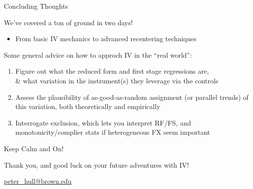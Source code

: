 \documentclass{beamer}
\begin{document}
\begin{frame}{Concluding Thoughts}

We've covered a ton of ground in two days! 
\begin{itemize}
\item From basic IV mechanics to advanced recentering techniques
\end{itemize}\bigskip\pause{}

Some general advice on how to approch IV in the ``real world'':
\begin{enumerate}
\item Figure out what the reduced form and first stage regressions are, \\ \& what variation in the instrument(s) they leverage via the controls
\item Assess the plausibility of as-good-as-random assignment (or parallel trends) of this variation, both theoretically and empirically
\item Interrogate exclusion, which lets you interpret RF/FS, and monotonicity/complier stats if heterogeneous FX seem important
\end{enumerate}
\end{frame}

\begin{frame}{Keep Calm and  On!}

\begin{center}
Thank you, and good luck on your future adventures with IV!

\bigskip
\url{peter_hull@brown.edu}

\end{center}
\end{frame}
\end{document}
